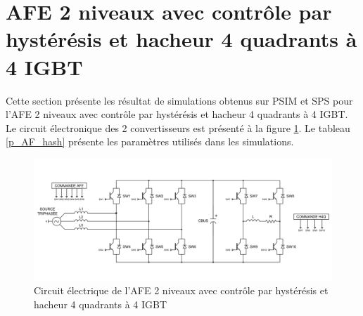\section{AFE 2 niveaux avec contrôle par hystérésis et hacheur 4 quadrants à 4 IGBT}
Cette section présente les résultat de simulations obtenus sur PSIM et SPS pour l'AFE 2 niveaux avec contrôle par hystérésis et hacheur 4 quadrants à 4 IGBT. Le circuit électronique des 2 convertisseurs est présenté à la figure \ref{circuit_H4Q_AFE_2L_RC}. Le tableau \ref{p_AF_hash} présente les paramètres utilisés dans les simulations.

\begin{figure}[htb]
\centering
\includegraphics[scale=0.6]{fig/H4Q_AFE_2L_RC.png}
\caption{Circuit électrique de l'AFE 2 niveaux avec contrôle par hystérésis et hacheur 4 quadrants à 4 IGBT}
\label{circuit_H4Q_AFE_2L_RC}
\end{figure}



